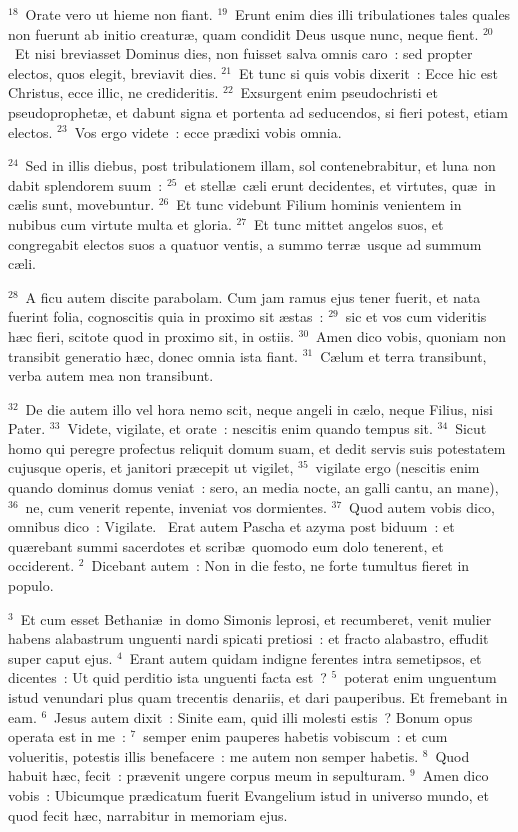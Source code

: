 ${}^{18}$~Orate vero ut hieme non fiant.
${}^{19}$~Erunt enim dies illi tribulationes tales quales non fuerunt ab initio creatur\ae , quam condidit Deus usque nunc, neque fient.
${}^{20}$~Et nisi breviasset Dominus dies, non fuisset salva omnis caro~: sed propter electos, quos elegit, breviavit dies.
${}^{21}$~Et tunc si quis vobis dixerit~: Ecce hic est Christus, ecce illic, ne credideritis.
${}^{22}$~Exsurgent enim pseudochristi et pseudoprophet\ae , et dabunt signa et portenta ad seducendos, si fieri potest, etiam electos.
${}^{23}$~Vos ergo videte~: ecce pr\ae dixi vobis omnia.


${}^{24}$~Sed in illis diebus, post tribulationem illam, sol contenebrabitur, et luna non dabit splendorem suum~:
${}^{25}$~et stell\ae\ c\ae li erunt decidentes, et virtutes, qu\ae\ in c\ae lis sunt, movebuntur.
${}^{26}$~Et tunc videbunt Filium hominis venientem in nubibus cum virtute multa et gloria.
${}^{27}$~Et tunc mittet angelos suos, et congregabit electos suos a quatuor ventis, a summo terr\ae\ usque ad summum c\ae li.


${}^{28}$~A ficu autem discite parabolam. Cum jam ramus ejus tener fuerit, et nata fuerint folia, cognoscitis quia in proximo sit \ae stas~:
${}^{29}$~sic et vos cum videritis h\ae c fieri, scitote quod in proximo sit, in ostiis.
${}^{30}$~Amen dico vobis, quoniam non transibit generatio h\ae c, donec omnia ista fiant.
${}^{31}$~C\ae lum et terra transibunt, verba autem mea non transibunt.


${}^{32}$~De die autem illo vel hora nemo scit, neque angeli in c\ae lo, neque Filius, nisi Pater.
${}^{33}$~Videte, vigilate, et orate~: nescitis enim quando tempus sit.
${}^{34}$~Sicut homo qui peregre profectus reliquit domum suam, et dedit servis suis potestatem cujusque operis, et janitori pr\ae cepit ut vigilet,
${}^{35}$~vigilate ergo (nescitis enim quando dominus domus veniat~: sero, an media nocte, an galli cantu, an mane),
${}^{36}$~ne, cum venerit repente, inveniat vos dormientes.
${}^{37}$~Quod autem vobis dico, omnibus dico~: Vigilate.
~Erat autem Pascha et azyma post biduum~: et qu\ae rebant summi sacerdotes et scrib\ae\ quomodo eum dolo tenerent, et occiderent.
${}^{2}$~Dicebant autem~: Non in die festo, ne forte tumultus fieret in populo.


${}^{3}$~Et cum esset Bethani\ae\ in domo Simonis leprosi, et recumberet, venit mulier habens alabastrum unguenti nardi spicati pretiosi~: et fracto alabastro, effudit super caput ejus.
${}^{4}$~Erant autem quidam indigne ferentes intra semetipsos, et dicentes~: Ut quid perditio ista unguenti facta est~?
${}^{5}$~poterat enim unguentum istud venundari plus quam trecentis denariis, et dari pauperibus. Et fremebant in eam.
${}^{6}$~Jesus autem dixit~: Sinite eam, quid illi molesti estis~? Bonum opus operata est in me~:
${}^{7}$~semper enim pauperes habetis vobiscum~: et cum volueritis, potestis illis benefacere~: me autem non semper habetis.
${}^{8}$~Quod habuit h\ae c, fecit~: pr\ae venit ungere corpus meum in sepulturam.
${}^{9}$~Amen dico vobis~: Ubicumque pr\ae dicatum fuerit Evangelium istud in universo mundo, et quod fecit h\ae c, narrabitur in memoriam ejus.


